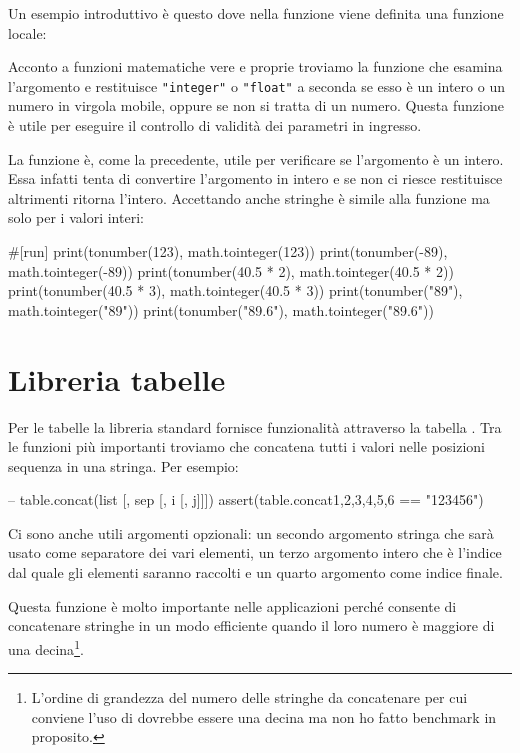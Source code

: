 Un esempio introduttivo è questo dove nella funzione  viene definita una
funzione locale:

Acconto a funzioni matematiche vere e proprie troviamo la funzione
 che esamina l'argomento e restituisce
\verb|"integer"| o \verb|"float"| a seconda se esso è un intero o un numero in
virgola mobile, oppure  se non si tratta di un numero. Questa funzione
è utile per eseguire il controllo di validità dei parametri in ingresso.

La funzione  è, come la precedente,
utile per verificare se l'argomento è un intero. Essa infatti tenta di
convertire l'argomento in intero e se non ci riesce restituisce 
altrimenti ritorna l'intero. Accettando anche stringhe è simile alla funzione
 ma solo per i valori interi:
\begin{lines}
#[run]
print(tonumber(123), math.tointeger(123))
print(tonumber(-89), math.tointeger(-89))
print(tonumber(40.5 * 2), math.tointeger(40.5 * 2))
print(tonumber(40.5 * 3), math.tointeger(40.5 * 3))
print(tonumber("89"), math.tointeger("89"))
print(tonumber("89.6"), math.tointeger("89.6"))
\end{lines}


\section{Libreria tabelle}

Per le tabelle la libreria standard fornisce funzionalità attraverso la tabella
. Tra le funzioni più importanti troviamo
 che concatena tutti i valori nelle
posizioni sequenza in una stringa. Per esempio:
\begin{lines}
-- table.concat(list [, sep [, i [, j]]])
assert(table.concat{1,2,3,4,5,6} == "123456")
\end{lines}

Ci sono anche utili argomenti opzionali: un secondo argomento stringa che sarà
usato come separatore dei vari elementi, un terzo argomento intero che è
l'indice dal quale gli elementi saranno raccolti e un quarto argomento come
indice finale.

Questa funzione è molto importante nelle applicazioni perché consente di
concatenare stringhe in un modo efficiente quando il loro numero è maggiore di
una decina\footnote{L'ordine di grandezza del numero delle stringhe da
concatenare per cui conviene l'uso di  dovrebbe essere una
decina ma non ho fatto benchmark in proposito.}.

